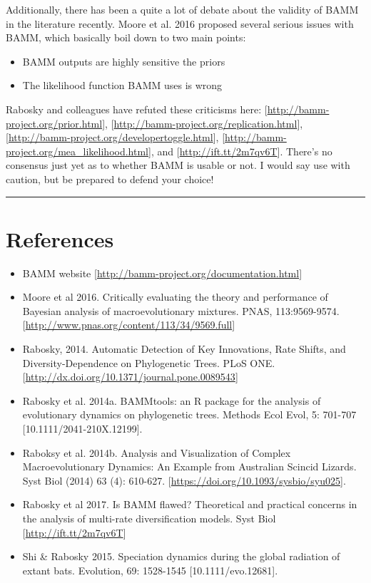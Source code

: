 \documentclass[]{book}
\providecommand{\tightlist}{%
  \setlength{\itemsep}{0pt}\setlength{\parskip}{0pt}}
\theoremstyle{definition}
\theoremstyle{definition}
\theoremstyle{definition}
\theoremstyle{remark}
\begin{document}
Additionally, there has been a quite a lot of debate about the validity
of BAMM in the literature recently. Moore et al. 2016 proposed several
serious issues with BAMM, which basically boil down to two main points:

\begin{itemize}
\tightlist
\item
  BAMM outputs are highly sensitive the priors
\item
  The likelihood function BAMM uses is wrong
\end{itemize}

Rabosky and colleagues have refuted these criticisms here:
{[}\url{http://bamm-project.org/prior.html}{]},
{[}\url{http://bamm-project.org/replication.html}{]},
{[}\url{http://bamm-project.org/developertoggle.html}{]},
{[}\url{http://bamm-project.org/mea_likelihood.html}{]}, and
{[}\url{http://ift.tt/2m7qv6T}{]}. There's no consensus just yet as to
whether BAMM is usable or not. I would say use with caution, but be
prepared to defend your choice!

\begin{center}\rule{0.5\linewidth}{\linethickness}\end{center}

\section{References}\label{references-5}

\begin{itemize}
\tightlist
\item
  BAMM website {[}\url{http://bamm-project.org/documentation.html}{]}
\item
  Moore et al 2016. Critically evaluating the theory and performance of
  Bayesian analysis of macroevolutionary mixtures. PNAS, 113:9569-9574.
  {[}\url{http://www.pnas.org/content/113/34/9569.full}{]}
\item
  Rabosky, 2014. Automatic Detection of Key Innovations, Rate Shifts,
  and Diversity-Dependence on Phylogenetic Trees. PLoS ONE.
  {[}\url{http://dx.doi.org/10.1371/journal.pone.0089543}{]}
\item
  Rabosky et al. 2014a. BAMMtools: an R package for the analysis of
  evolutionary dynamics on phylogenetic trees. Methods Ecol Evol, 5:
  701-707 {[}10.1111/2041-210X.12199{]}.
\item
  Raboksy et al. 2014b. Analysis and Visualization of Complex
  Macroevolutionary Dynamics: An Example from Australian Scincid
  Lizards. Syst Biol (2014) 63 (4): 610-627.
  {[}\url{https://doi.org/10.1093/sysbio/syu025}{]}.
\item
  Rabosky et al 2017. Is BAMM flawed? Theoretical and practical concerns
  in the analysis of multi-rate diversification models. Syst Biol
  {[}\url{http://ift.tt/2m7qv6T}{]}
\item
  Shi \& Rabosky 2015. Speciation dynamics during the global radiation
  of extant bats. Evolution, 69: 1528-1545 {[}10.1111/evo.12681{]}.
\end{itemize}
\end{document}
